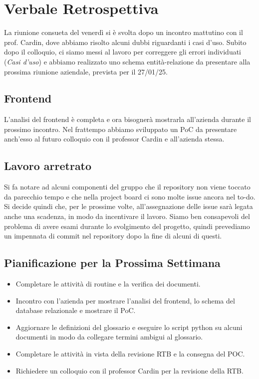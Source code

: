 \documentclass{article}
\begin{document}
\section{Verbale Retrospettiva}
La riunione consueta del venerdì si è svolta dopo un incontro mattutino con il prof. Cardin, dove abbiamo risolto alcuni dubbi riguardanti i casi d'uso.
Subito dopo il colloquio, ci siamo messi al lavoro per correggere gli errori individuati (\textit{Casi d'uso}) e abbiamo realizzato uno schema entità-relazione da presentare alla prossima riunione aziendale, prevista per il 27/01/25.
\subsection{Frontend}
L'analisi del frontend è completa e ora bisognerà mostrarla all'azienda durante il prossimo incontro. Nel frattempo abbiamo sviluppato un PoC da presentare anch'esso al futuro colloquio con il professor Cardin e all'azienda stessa.
\subsection{Lavoro arretrato}
Si fa notare ad alcuni componenti del gruppo che il repository non viene toccato da parecchio tempo e che nella project board ci sono molte issue ancora nel to-do. Si decide quindi che, per le prossime volte, all'assegnazione delle issue sarà legata anche una scadenza, in modo da incentivare il lavoro. Siamo ben consapevoli del problema di avere esami durante lo svolgimento del progetto, quindi prevediamo un impennata di commit nel repository dopo la fine di alcuni di questi.

\subsection{Pianificazione per la Prossima Settimana}
\begin{itemize}
    \item Completare le attività di routine e la verifica dei documenti.
    \item Incontro con l'azienda per mostrare l'analisi del frontend, lo schema del database relazionale e mostrare il PoC.
    \item Aggiornare le definizioni del glossario e eseguire lo script python su alcuni documenti in modo da collegare termini ambigui al glossario.
    \item Completare le attività in vista della revisione RTB e la consegna del POC.
    \item Richiedere un colloquio con il professor Cardin per la revisione della RTB.
\end{itemize}
\end{document}
